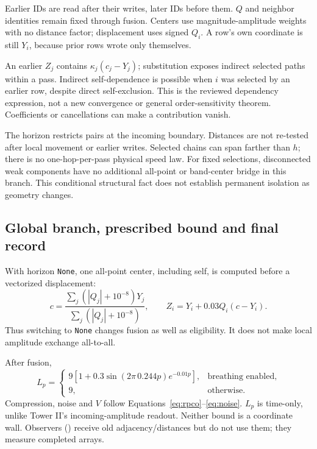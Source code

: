 Earlier IDs are read after their writes, later IDs before them. \(Q\) and neighbor identities remain fixed through fusion. Centers use magnitude-amplitude weights with no distance factor; displacement uses signed \(Q_i\). A row's own coordinate is still \(Y_i\), because prior rows wrote only themselves.

An earlier \(Z_j\) contains \(\kappa_j(c_j-Y_j)\); substitution exposes indirect selected paths within a pass. Indirect self-dependence is possible when \(i\) was selected by an earlier row, despite direct self-exclusion. This is the reviewed dependency expression, not a new convergence or general order-sensitivity theorem. Coefficients or cancellations can make a contribution vanish.

The horizon restricts pairs at the incoming boundary. Distances are not re-tested after local movement or earlier writes. Selected chains can span farther than \(h\); there is no one-hop-per-pass physical speed law. For fixed selections, disconnected weak components have no additional all-point or band-center bridge in this branch. This conditional structural fact does not establish permanent isolation as geometry changes.

\subsection{Global branch, prescribed bound and final record}
With horizon \texttt{None}, one all-point center, including self, is computed before a vectorized displacement:
\begin{equation}\label{eq:global}
c=\frac{\sum_j(|Q_j|+10^{-8})Y_j}{\sum_j(|Q_j|+10^{-8})},
\qquad Z_i=Y_i+0.03Q_i(c-Y_i).
\end{equation}
Thus switching to \texttt{None} changes fusion as well as eligibility. It does not make local amplitude exchange all-to-all.

After fusion,
\begin{equation}\label{eq:LU}
L_p=\begin{cases}
9[1+0.3\sin(2\pi\,0.244p)e^{-0.01p}],&\text{breathing enabled},\\
9,&\text{otherwise}.
\end{cases}
\end{equation}
Compression, noise and \(V\) follow Equations~\eqref{eq:rpco}--\eqref{eq:noise}. \(L_p\) is time-only, unlike Tower II's incoming-amplitude readout. Neither bound is a coordinate wall. Observers () receive old adjacency/distances but do not use them; they measure completed arrays.

